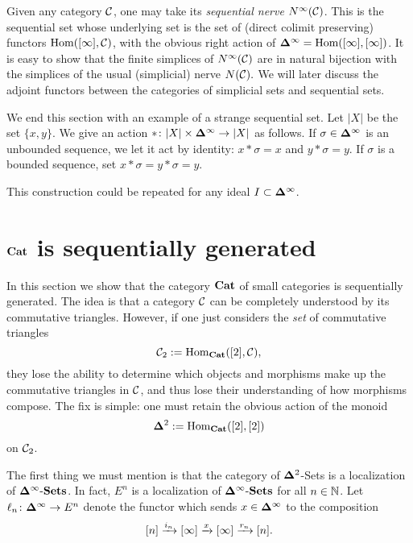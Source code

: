 \documentclass{amsart}
\def\Del{{\bf \Delta}}
\def\dashSets{{\tn{-}\Sets}}
\def\Delinf{{\Del^\infty}}
\def\DSets{{\Delinf\dashSets}}
\begin{document}
\begin{example}

Given any category $\mathcal{C}$, one may take its {\em sequential nerve} $N^\infty(\mathcal{C})$.  This is the sequential set whose underlying set is the set of (direct colimit preserving) functors $\textnormal{Hom}([\infty],\mathcal{C})$, with the obvious right action of $\Delinf=\Hom([\infty],[\infty])$.  It is easy to show that the finite simplices of $N^\infty(\mathcal{C})$ are in natural bijection with the simplices of the usual (simplicial) nerve $N(\mathcal{C}).$  We will later discuss the adjoint functors between the categories of simplicial sets and sequential sets.

\end{example}

\begin{example}

We end this section with an example of a strange sequential set.  Let $|X|$ be the set $\{x,y\}$.  We give an action $*\taking |X|\cross\Delinf\to|X|$ as follows.  If $\sigma\in\Delinf$ is an unbounded sequence, we let it act by identity:  $x*\sigma=x$ and $y*\sigma=y$.  If $\sigma$ is a bounded sequence, set $x*\sigma=y*\sigma=y.$   

This construction could be repeated for any ideal $I\ss\Delinf$.

\end{example}

\section{${\bf Cat}$ is sequentially generated}

In this section we show that the category ${\bf Cat}$ of small categories is sequentially generated.  The idea is that a category $\mathcal{C}$ can be completely understood by its commutative triangles.  However, if one just considers the {\em set} of commutative triangles $$\mathcal{C}_2:=\textnormal{Hom}_{\bf Cat}([2],\mathcal{C}),$$ they lose the ability to determine which objects and morphisms make up the commutative triangles in $\mathcal{C}$, and thus lose their understanding of how morphisms compose.  The fix is simple: one must retain the obvious action of the monoid $$\Del^2:=\Hom_\Cat([2],[2])$$ on $\mathcal{C}_2$.

The first thing we must mention is that the category of $\Del^2$-Sets is a localization of $\DSets$.  In fact, $ E^n$ is a localization of $\DSets$ for all $n\in{\mathbb N}$.  Let $\ell_n\taking\Delinf\to E^n$ denote the functor which sends $x\in\Delinf$ to the composition $$[n]\xrightarrow{i_n}[\infty]\xrightarrow{x}[\infty]\xrightarrow{r_n}[n].$$
\end{document}
